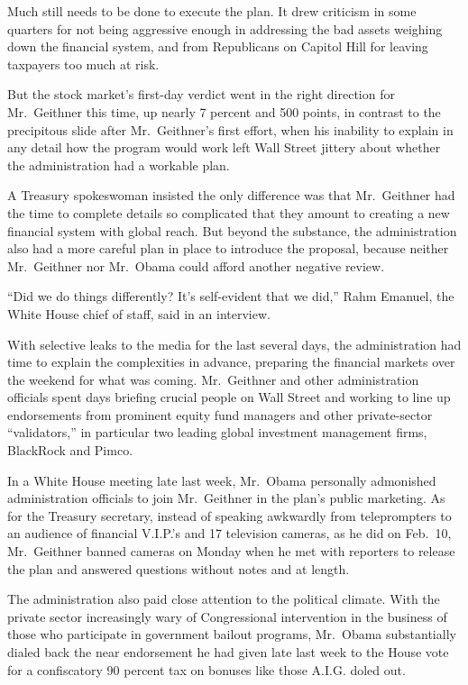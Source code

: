 \documentclass[12pt,a4paper,onecolumn]{article}
\begin{document}
\begin{CJK*}{GBK}{song}
Much still needs to be done to execute the plan. It drew criticism in some quarters for not being
aggressive enough in addressing the bad assets weighing down the financial system, and from
Republicans on Capitol Hill for leaving taxpayers too much at risk.

But the stock market's first-day verdict went in the right direction for Mr.~Geithner this time, up
nearly 7 percent and 500 points, in contrast to the precipitous slide after Mr.~Geithner's first
effort, when his inability to explain in any detail how the program would work left Wall Street
jittery about whether the administration had a workable plan.

A Treasury spokeswoman insisted the only difference was that Mr.~Geithner had the time to complete
details so complicated that they amount to creating a new financial system with global reach. But
beyond the substance, the administration also had a more careful plan in place to introduce the
proposal, because neither Mr.~Geithner nor Mr.~Obama could afford another negative review.

``Did we do things differently? It's self-evident that we did,'' Rahm Emanuel, the White House chief
of staff, said in an interview.

With selective leaks to the media for the last several days, the administration had time to explain
the complexities in advance, preparing the financial markets over the weekend for what was coming.
Mr.~Geithner and other administration officials spent days briefing crucial people on Wall Street
and working to line up endorsements from prominent equity fund managers and other private-sector
``validators,'' in particular two leading global investment management firms, BlackRock and Pimco.

In a White House meeting late last week, Mr.~Obama personally admonished administration officials to
join Mr.~Geithner in the plan's public marketing. As for the Treasury secretary, instead of speaking
awkwardly from teleprompters to an audience of financial V.I.P.'s and 17 television cameras, as he
did on Feb.~10, Mr.~Geithner banned cameras on Monday when he met with reporters to release the plan
and answered questions without notes and at length.

The administration also paid close attention to the political climate. With the private sector
increasingly wary of Congressional intervention in the business of those who participate in
government bailout programs, Mr.~Obama substantially dialed back the near endorsement he had given
late last week to the House vote for a confiscatory 90 percent tax on bonuses like those A.I.G.
doled out.


\end{CJK*}
\end{document}
